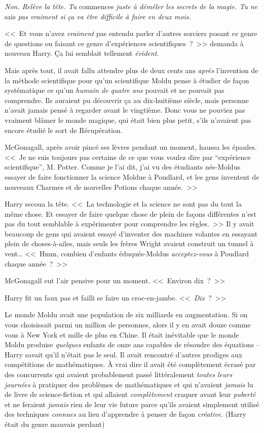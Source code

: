 \emph{Non. Relève la tête. Tu} commences \emph{juste à démêler les secrets de la magie. Tu ne} sais \emph{pas vraiment si ça va être difficile à faire en deux mois.}

<<~Et vous n'avez \emph{vraiment} pas entendu parler d'autres sorciers posant ce genre de questions ou faisant ce genre d'expériences scientifiques~?~>> demanda à nouveau Harry. Ça lui semblait tellement \emph{évident}.

Mais après tout, il avait fallu attendre plus de deux cents ans \emph{après} l'invention de la méthode scientifique pour qu'un scientifique Moldu pense à étudier de façon systématique ce qu'un \emph{humain de quatre ans} pouvait et ne pouvait pas comprendre. Ils auraient pu découvrir ça au dix-huitième siècle, mais personne n'avait jamais pensé à regarder avant le vingtième. Donc vous ne pouviez pas vraiment blâmer le monde magique, qui était bien plus petit, s'ils n'avaient pas encore étudié le sort de Récupération.

McGonagall, après avoir pincé ses lèvres pendant un moment, haussa les épaules. <<~Je ne suis toujours pas certaine de ce que vous voulez dire par “expérience scientifique”, M. Potter. Comme je l'ai dit, j'ai vu des étudiants nés-Moldus essayer de faire fonctionner la science Moldue à Poudlard, et les gens inventent de nouveaux Charmes et de nouvelles Potions chaque année.~>>

Harry secoua la tête. <<~La technologie et la science ne sont pas du tout la même chose. Et essayer de faire quelque chose de plein de façons différentes n'est pas du tout semblable à expérimenter pour comprendre les règles.~>> Il y avait beaucoup de gens qui avaient essayé d'inventer des machines volantes en essayant plein de choses-à-ailes, mais seuls les frères Wright avaient construit un tunnel à vent… <<~Hmm, combien d'enfants éduqués-Moldus \emph{acceptez-vous} à Poudlard chaque année~?~>>

McGonagall eut l'air pensive pour un moment. <<~Environ dix~?~>>

Harry fit un faux pas et failli se faire un croc-en-jambe. <<~\emph{Dix}~?~>>

Le monde Moldu avait une population de six milliards en augmentation. Si on vous choisissait parmi un million de personnes, alors il y en avait douze comme vous à New York et mille de plus en Chine. Il était inévitable que le monde Moldu produise \emph{quelques} enfants de onze ans capables de résoudre des équations -- Harry savait qu'il n'était pas le seul. Il avait rencontré d'autres prodiges aux compétitions de mathématiques. À vrai dire il avait été complètement écrasé par des concurrents qui avaient probablement passé littéralement \emph{toutes leurs journées} à pratiquer des problèmes de mathématiques et qui n'avaient \emph{jamais} lu de livre de science-fiction et qui allaient \emph{complètement} craquer avant leur \emph{puberté} et ne feraient \emph{jamais} rien de leur vie future parce qu'ils avaient simplement utilisé des techniques \emph{connues} au lieu d'apprendre à penser de façon \emph{créative}. (Harry était du genre mauvais perdant)

